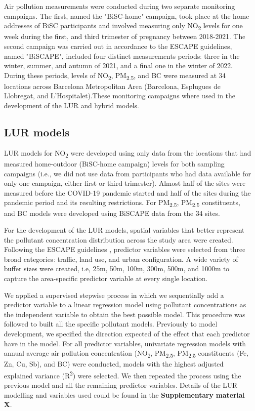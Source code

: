 \documentclass{article}
\begin{document}
Air pollution measurements were conducted during two separate monitoring campaigns. The first, named the "BiSC-home" campaign, took place at the home addresses of BiSC participants and involved measuring only NO\textsubscript{2} levels for one week during the first, and third trimester of pregnancy between 2018-2021. The second campaign was carried out in accordance to the ESCAPE guidelines, named "BiSCAPE", included four distinct measurements periods: three in the winter, summer, and autumn of 2021, and a final one in the winter of 2022. During these periods, levels of NO\textsubscript{2}, PM\textsubscript{2.5}, and BC were measured at 34 locations across Barcelona Metropolitan Area (Barcelona, Esplugues de Llobregat, and L'Hospitalet).These monitoring campaigns where used in the development of the LUR and hybrid models.

\subsection{LUR models}

LUR models for NO\textsubscript{2}  were developed using only data from the locations that had measured home-outdoor (BiSC-home campaign) levels for both sampling campaigns (i.e., we did not use data from participants who had data available for only one campaign, either first or third trimester). Almost half of the sites were measured before the COVID-19 pandemic started and half of the sites during the pandemic period and its resulting restrictions. For PM\textsubscript{2.5}, PM\textsubscript{2.5} constituents, and BC models were developed using BiSCAPE data from the 34 sites.

For the development of the LUR models, spatial variables that better represent the pollutant concentration distribution across the study area were created. Following the ESCAPE guidelines \cite{eeftens2012, beelen2013},  predictor variables were selected from three broad categories: traffic, land use, and urban configuration. A wide variety of buffer sizes were created, i.e, 25m, 50m, 100m, 300m, 500m, and 1000m to capture the area-specific predictor variable at every single location.

We applied a supervised stepwise process in which we sequentially add a predictor variable to a linear regression model using pollutant concentrations as the independent variable to obtain the best possible model. This procedure was followed to built all the specific pollutant models. Previously to model development, we specified the direction expected of the effect that each predictor have in the model. For all predictor variables, univariate regression models with annual average air pollution concentration (NO\textsubscript{2}, PM\textsubscript{2.5}, PM\textsubscript{2.5} constituents (Fe, Zn, Cu, Sb), and BC) were conducted, models with the highest adjusted explained variance (R\textsuperscript{2}) were selected. We then repeated the process using the previous model and all the remaining predictor variables. Details of the LUR modelling and variables used could be found in the \textbf{Supplementary material X}.
\end{document}

